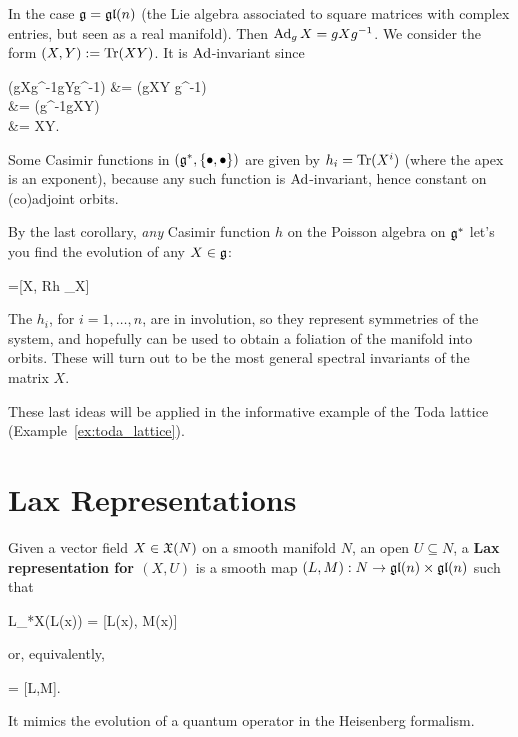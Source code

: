 \documentclass[main.tex]{subfiles}
\begin{document}
\begin{example}
	In the case $\mathfrak g = \mathfrak{gl}(n)$ (the Lie algebra associated to square matrices with complex entries, but seen as a real manifold). Then $\operatorname{Ad}_g X = gXg^{-1}$. We consider the form $(X,Y) := \operatorname{Tr}(XY)$. It is $\operatorname{Ad}$-invariant since
	\begin{eqalign}
		\trace (gXg^{-1}gYg^{-1}) &= \trace (gXY g^{-1})\\
			&= \trace (g^{-1}gXY) \\
			&= \trace XY.
	\end{eqalign}
	Some Casimir functions in $(\mathfrak g^*, \{\bullet,\bullet\})$ are given by $h_i = \operatorname{Tr} (X^i)$ (where the apex is an exponent), because any such function is $\operatorname{Ad}$-invariant, hence constant on (co)adjoint orbits.

	By the last corollary, \emph{any} Casimir function $h$ on the Poisson algebra on $\mathfrak g^*$ let's you find the evolution of any $X \in \mathfrak g$:
	\begin{eqalign}
		 =[X, R\nabla h \vert_X]
	\end{eqalign}
	The $h_i$, for $i=1,\ldots,n$, are in involution, so they represent symmetries of the system, and hopefully can be used to obtain a foliation of the manifold into orbits. These will turn out to be the most general spectral invariants of the matrix $X$.
\end{example}

These last ideas will be applied in the informative example of the Toda lattice (Example~\ref{ex:toda_lattice}).

\section{Lax Representations}
\begin{definition}
	Given a vector field $X \in \mathfrak{X}(N)$ on a smooth manifold $N$, an open $U \subseteq N$, a \textbf{Lax representation for $(X, U)$} is a smooth map $(L, M) : N \to \mathfrak{gl}(n) \times \mathfrak{gl}(n)$ such that
	\begin{eqalign}
		L_*X(L(x)) = [L(x), M(x)]
	\end{eqalign}
	or, equivalently,
	\begin{eqalign}
		 = [L,M].
	\end{eqalign}
\end{definition}

It mimics the evolution of a quantum operator in the Heisenberg formalism.
\end{document}
